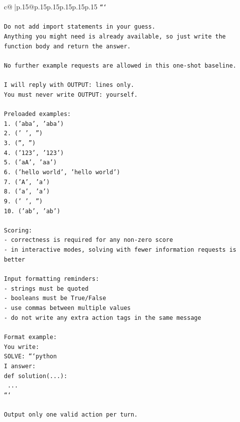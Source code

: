 \documentclass{article}
\begin{document}
{\begin{supertabular}{c@{$\;$}|p{.15\linewidth}@{}p{.15\linewidth}p{.15\linewidth}p{.15\linewidth}p{.15\linewidth}p{.15\linewidth}}
{{{\texttt{```} \\
\\ 
\texttt{Do not add import statements in your guess.} \\
\texttt{Anything you might need is already available, so just write the function body and return the answer.} \\
\\ 
\texttt{No further example requests are allowed in this one{-}shot baseline.} \\
\\ 
\texttt{I will reply with OUTPUT: lines only.} \\
\texttt{You must never write OUTPUT: yourself.} \\
\\ 
\texttt{Preloaded examples:} \\
\texttt{1. ('aba', 'aba')} \\
\texttt{2. (' ', '')} \\
\texttt{3. ('', '')} \\
\texttt{4. ('123', '123')} \\
\texttt{5. ('aA', 'aa')} \\
\texttt{6. ('hello world', 'hello world')} \\
\texttt{7. ('A', 'a')} \\
\texttt{8. ('a', 'a')} \\
\texttt{9. ('   ', '')} \\
\texttt{10. ('ab', 'ab')} \\
\\ 
\texttt{Scoring:} \\
\texttt{{-} correctness is required for any non{-}zero score} \\
\texttt{{-} in interactive modes, solving with fewer information requests is better} \\
\\ 
\texttt{Input formatting reminders:} \\
\texttt{{-} strings must be quoted} \\
\texttt{{-} booleans must be True/False} \\
\texttt{{-} use commas between multiple values} \\
\texttt{{-} do not write any extra action tags in the same message} \\
\\ 
\texttt{Format example:} \\
\texttt{You write:} \\
\texttt{SOLVE: ```python} \\
\texttt{I answer:} \\
\texttt{def solution(...):} \\
\texttt{    ...} \\
\texttt{```} \\
\\ 
\texttt{Output only one valid action per turn.} \\
            }
        }
    }
     \\ \\


\end{supertabular}}
\end{document}

